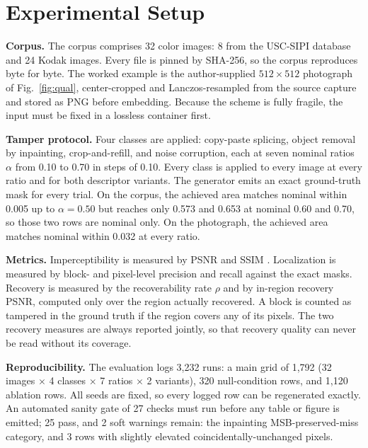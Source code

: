 \section{Experimental Setup}
\label{sec:setup}

\textbf{Corpus.} The corpus comprises 32 color images: 8 from the USC-SIPI database \cite{uscsipi} and 24 Kodak images. Every file is pinned by SHA-256, so the corpus reproduces byte for byte. The worked example is the author-supplied $512\times512$ photograph of Fig.~\ref{fig:qual}, center-cropped and Lanczos-resampled from the source capture and stored as PNG before embedding. Because the scheme is fully fragile, the input must be fixed in a lossless container first.

\textbf{Tamper protocol.} Four classes are applied: copy-paste splicing, object removal by inpainting, crop-and-refill, and noise corruption, each at seven nominal ratios $\alpha$ from 0.10 to 0.70 in steps of 0.10. Every class is applied to every image at every ratio and for both descriptor variants. The generator emits an exact ground-truth mask for every trial. On the corpus, the achieved area matches nominal within 0.005 up to $\alpha=0.50$ but reaches only 0.573 and 0.653 at nominal 0.60 and 0.70, so those two rows are nominal only. On the photograph, the achieved area matches nominal within 0.032 at every ratio.

\textbf{Metrics.} Imperceptibility is measured by PSNR and SSIM \cite{wang2004image}. Localization is measured by block- and pixel-level precision and recall against the exact masks. Recovery is measured by the recoverability rate $\rho$ and by in-region recovery PSNR, computed only over the region actually recovered. A block is counted as tampered in the ground truth if the region covers any of its pixels. The two recovery measures are always reported jointly, so that recovery quality can never be read without its coverage.

\textbf{Reproducibility.} The evaluation logs 3,232 runs: a main grid of 1,792 (32 images $\times$ 4 classes $\times$ 7 ratios $\times$ 2 variants), 320 null-condition rows, and 1,120 ablation rows. All seeds are fixed, so every logged row can be regenerated exactly. An automated sanity gate of 27 checks must run before any table or figure is emitted; 25 pass, and 2 soft warnings remain: the inpainting MSB-preserved-miss category, and 3 rows with slightly elevated coincidentally-unchanged pixels.
